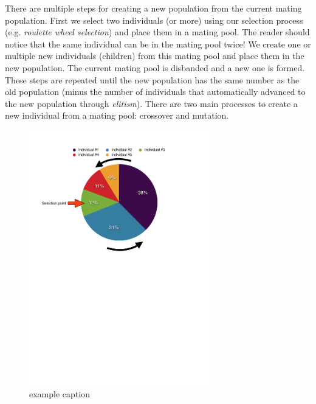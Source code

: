There are multiple steps for creating a new population from the current mating population. First we select two individuals (or more) using our selection process (e.g. \textit{roulette wheel selection}) and place them in a mating pool. The reader should notice that the same individual can be in the mating pool twice! We create one or multiple new individuals (children) from this mating pool and place them in the new population. The current mating pool is disbanded and a new one is formed. These steps are repeated until the new population has the same number as the old population (minus the number of individuals that automatically advanced to the new population through \textit{elitism}). 
There are two main processes to create a new individual from a mating pool: crossover and mutation.
\begin{figure}[htbp] %
   \centering
   \includegraphics[width=0.7\textwidth]{chapter_dalek/plots/rws_cropped.pdf} 
   \caption{example caption}
   \label{fig:example}
\end{figure}

